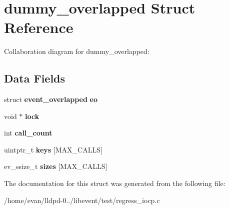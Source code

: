 \section{dummy\-\_\-overlapped \-Struct \-Reference}
\label{structdummy__overlapped}


\-Collaboration diagram for dummy\-\_\-overlapped\-:
\subsection*{\-Data \-Fields}
\begin{DoxyCompactItemize}
\item 
struct {\bf event\-\_\-overlapped} {\bfseries eo}\label{structdummy__overlapped_a04b38a0ee50fdff0e28997e7a90a28db}

\item 
void $\ast$ {\bfseries lock}\label{structdummy__overlapped_a100fdaedb8eb0d56fd262e7ea2930930}

\item 
int {\bfseries call\-\_\-count}\label{structdummy__overlapped_a5e0f60888f1d0bb3daf99036125b899a}

\item 
uintptr\-\_\-t {\bfseries keys} [\-M\-A\-X\-\_\-\-C\-A\-L\-L\-S]\label{structdummy__overlapped_a4b776e96a141367abe60f124fd380b18}

\item 
ev\-\_\-ssize\-\_\-t {\bfseries sizes} [\-M\-A\-X\-\_\-\-C\-A\-L\-L\-S]\label{structdummy__overlapped_aae953a1bdac1729a305298441ebeedd7}

\end{DoxyCompactItemize}


\-The documentation for this struct was generated from the following file\-:\begin{DoxyCompactItemize}
\item 
/home/evan/lldpd-\/0../libevent/test/regress\-\_\-iocp.\-c\end{DoxyCompactItemize}
